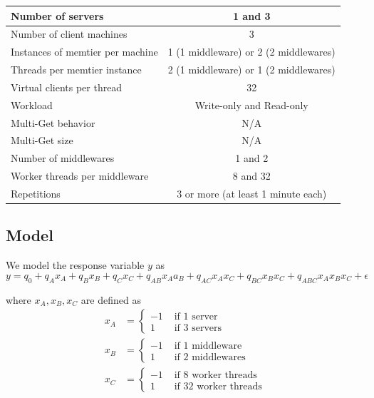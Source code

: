 \documentclass[11pt,a4paper]{article}
\begin{document}
\begin{center}
	\scriptsize{
		\begin{tabular}{|l|c|}
			\hline Number of servers                & 1 and 3                                     \\ 
			\hline Number of client machines        & 3                                           \\ 
			\hline Instances of memtier per machine & 1 (1 middleware) or 2 (2 middlewares) \\ 
			\hline Threads per memtier instance     & 2 (1 middleware) or 1 (2 middlewares)   \\
			\hline Virtual clients per thread       &  32                                     \\ 
			\hline Workload                         & Write-only and Read-only\\
			\hline Multi-Get behavior               & N/A                                         \\
			\hline Multi-Get size                   & N/A                                         \\
			\hline Number of middlewares            & 1 and 2                                     \\
			\hline Worker threads per middleware    & 8 and 32                                    \\
			\hline Repetitions                      & 3 or more (at least 1 minute each)                                   \\ 
			\hline 
		\end{tabular}
	} 
\end{center}

\subsection{Model}

We model the response variable $y$ as\\
\begin{equation}
    y = q_0 + q_Ax_A + q_Bx_B + q_Cx_C + q_{AB}x_Aa_B + q_{AC}x_Ax_C + q_{BC}x_Bx_C + q_{ABC}x_Ax_Bx_C + \epsilon
\end{equation}

where $x_A, x_B, x_C$ are defined as\\
\begin{align*}
x_A &= 
\begin{cases}
    -1 & \text{ if 1 server}\\
    1 & \text{ if 3 servers}
\end{cases}
\\
x_B &=
\begin{cases}
    -1 & \text{ if 1 middleware}\\
    1 & \text{ if 2 middlewares}
\end{cases}
\\
x_C &=
\begin{cases}
    -1 & \text{ if 8 worker threads}\\
    1 & \text{ if 32 worker threads}
\end{cases}
\end{align*}
\end{document}
